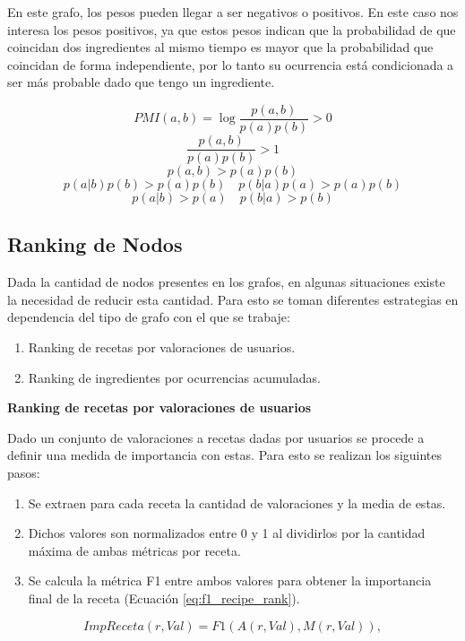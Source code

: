 \documentclass[
	a4paper, %
	10pt, %
	unnumberedsections, %
	twoside, %
]{LTJournalArticle}
\begin{document}
En este grafo, los pesos pueden llegar a ser negativos o positivos. En este caso nos interesa los pesos positivos,
ya que estos pesos indican que la probabilidad de que coincidan dos ingredientes al mismo tiempo es mayor que la
probabilidad que coincidan de forma independiente, por lo tanto su ocurrencia está condicionada a ser más probable
dado que tengo un ingrediente.

$$
PMI(a,b) = \log \frac{p(a,b)}{p(a)p(b)} > 0
$$
$$
\frac{p(a,b)}{p(a)p(b)} > 1
$$
$$
p(a,b) > p(a)p(b)
$$
$$
p(a|b)p(b) > p(a)p(b) \quad p(b|a)p(a) > p(a)p(b)
$$
$$
p(a|b) > p(a) \quad p(b|a) > p(b)
$$
	
\subsection{Ranking de Nodos}

Dada la cantidad de nodos presentes en los grafos, en algunas situaciones existe la necesidad de reducir esta
cantidad. Para esto se toman diferentes estrategias en dependencia del tipo de grafo con el que se trabaje:

\begin{enumerate}
	\item Ranking de recetas por valoraciones de usuarios.
	\item Ranking de ingredientes por ocurrencias acumuladas.
\end{enumerate}

\textbf{Ranking de recetas por valoraciones de usuarios}

Dado un conjunto de valoraciones a recetas dadas por usuarios se procede a definir 
una medida de importancia con estas. Para esto se realizan los siguintes pasos:

\begin{enumerate}
	\item Se extraen para cada receta la cantidad de valoraciones y la media de estas.
	\item Dichos valores son normalizados entre 0 y 1 al dividirlos por la cantidad máxima de ambas métricas por receta.
	\item Se calcula la métrica F1 entre ambos valores para obtener la importancia final de la receta (Ecuación \ref{eq:f1_recipe_rank}).
\end{enumerate}

\begin{equation}
	ImpReceta(r, Val) = F1(A(r, Val), M(r, Val)),
	\label{eq:f1_recipe_rank}
\end{equation}
\end{document}
